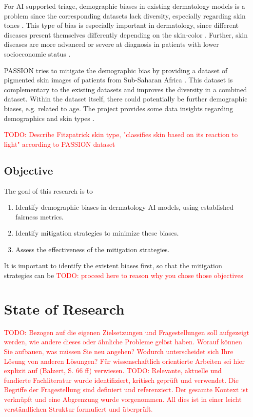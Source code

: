 \documentclass[a4paper,10.5pt,
			   bindingoffset=0.2in,left=3.35cm,right=2.12cm,top=3.75cm,bottom=2.88cm,%
				footskip=.25in
				listof=numbered,toc=chapterentrywithdots]{scrreport}
\renewcommand{\todo}[1]{\textcolor{red}{TODO: #1}}
\begin{document}
			For AI supported triage, demographic biases in existing dermatology models is a problem since the corresponding datasets lack diversity, especially regarding skin tones \autocite{Gottfrois2024}. This type of bias is especially important in dermatology, since different diseases present themselves differently depending on the skin-color \autocite{Diaz2022}. Further, skin diseases are more advanced or severe at diagnosis in patients with lower socioeconomic status \autocite{BAD2021}.
			
			PASSION tries to mitigate the demographic bias by providing a dataset of pigmented skin images of patients from Sub-Saharan Africa \autocite{Gottfrois2024}. This dataset is complementary to the existing datasets and improves the diversity in a combined dataset. Within the dataset itself, there could potentially be further demographic biases, e.g. related to age. The project provides some data insights regarding demographics and skin types \autocite{Gottfrois2024}.
			 
			 
 			\todo{Describe Fitzpatrick skin type, "classifies skin based on its reaction to light" according to PASSION dataset}
			 
		\section{Objective}
		The goal of this research is to
		\begin{enumerate}
			\item Identify demographic biases in dermatology AI models, using established fairness metrics.
			\item Identify mitigation strategies to minimize these biases.
			\item Assess the effectiveness of the mitigation strategies.
		\end{enumerate}
		It is important to identify the existent biases first, so that the mitigation strategies can be \todo{proceed here to reason why you chose those objectives}
		
	
	\chapter{State of Research}
		\todo{Bezogen auf die eigenen Zielsetzungen und Fragestellungen soll aufgezeigt werden, wie andere dieses oder ähnliche Probleme gelöst haben. Worauf können Sie aufbauen, was müssen Sie neu angehen?	Wodurch unterscheidet sich Ihre Lösung von anderen Lösungen? Für wissenschaftlich orientierte Arbeiten sei hier explizit auf (Balzert, S. 66 ff) verwiesen.}
		\todo{Relevante, aktuelle und fundierte Fachliteratur wurde identifiziert, kritisch geprüft und verwendet. Die Begriffe der Fragestellung sind definiert und referenziert. Der gesamte Kontext ist verknüpft und eine Abgrenzung wurde vorgenommen. All dies ist in einer leicht verständlichen Struktur formuliert und überprüft.}
	
\end{document}

